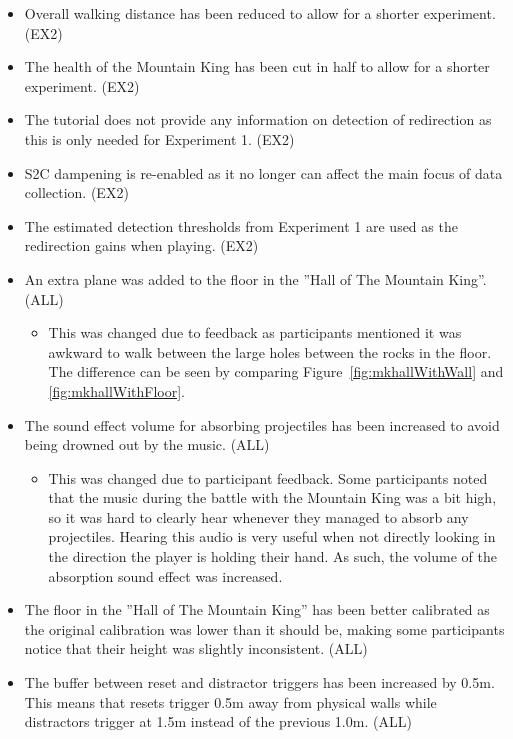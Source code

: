 \begin{itemize}
    \item Overall walking distance has been reduced to allow for a shorter experiment. (EX2)
    \item The health of the Mountain King has been cut in half to allow for a shorter experiment. (EX2)
    \item The tutorial does not provide any information on detection of redirection as this is only needed for Experiment 1. (EX2)
    \item S2C dampening is re-enabled as it no longer can affect the main focus of data collection. (EX2)
    \item The estimated detection thresholds from Experiment 1 are used as the redirection gains when playing. (EX2)
    \item An extra plane was added to the floor in the ''Hall of The Mountain King''. (ALL)
    \begin{itemize}
        \item This was changed due to feedback as participants mentioned it was awkward to walk between the large holes between the rocks in the floor. The difference can be seen by comparing Figure~\ref{fig:mkhallWithWall} and \ref{fig:mkhallWithFloor}.
    \end{itemize}
    \item The sound effect volume for absorbing projectiles has been increased to avoid being drowned out by the music. (ALL)
    \begin{itemize}
        \item This was changed due to participant feedback. Some participants noted that the music during the battle with the Mountain King was a bit high, so it was hard to clearly hear whenever they managed to absorb any projectiles. Hearing this audio is very useful when not directly looking in the direction the player is holding their hand. As such, the volume of the absorption sound effect was increased.
    \end{itemize}
    \item The floor in the ''Hall of The Mountain King'' has been better calibrated as the original calibration was lower than it should be, making some participants notice that their height was slightly inconsistent. (ALL)
    \item The buffer between reset and distractor triggers has been increased by 0.5m. This means that resets trigger 0.5m away from physical walls while distractors trigger at 1.5m instead of the previous 1.0m. (ALL)

\end{itemize}
